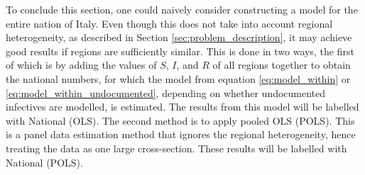 \documentclass[12pt]{article}
\begin{document}
	
	
	To conclude this section, one could naively consider constructing a model for the entire nation of Italy. Even though this does not take into account regional heterogeneity, as described in Section \ref{sec:problem_description}, it may achieve good results if regions are sufficiently similar. This is done in two ways, the first of which is by adding the values of $S$, $I$, and $R$ of all regions together to obtain the national numbers, for which the model from equation \eqref{eq:model_within} or \eqref{eq:model_within_undocumented}, depending on whether undocumented infectives are modelled, is estimated. The results from this model will be labelled with National (OLS). The second method is to apply pooled OLS (POLS). This is a panel data estimation method that ignores the regional heterogeneity, hence treating the data as one large cross-section. These results will be labelled with National (POLS).
	
\end{document}
